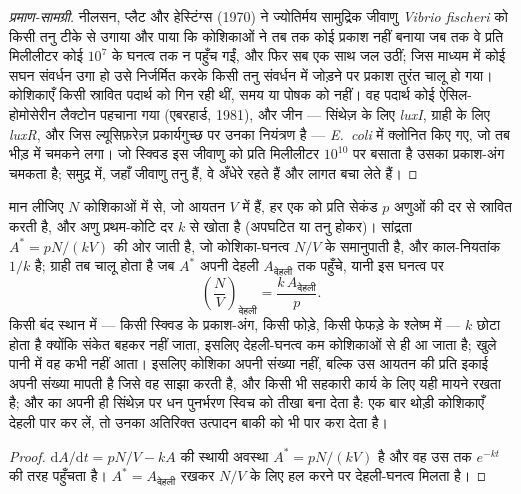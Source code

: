 \begin{proof}[प्रमाण-सामग्री]
नीलसन, प्लैट और हेस्टिंग्स (1970) ने ज्योतिर्मय सामुद्रिक जीवाणु
\emph{Vibrio fischeri} को किसी तनु टीके से उगाया और पाया कि कोशिकाओं ने
तब तक कोई प्रकाश नहीं बनाया जब तक वे प्रति मिलीलीटर कोई $10^{7}$ के
घनत्व तक न पहुँच गईं, और फिर सब एक साथ जल उठीं; जिस माध्यम में कोई सघन
संवर्धन उगा हो उसे निर्जर्मित करके किसी तनु संवर्धन में जोड़ने पर
प्रकाश तुरंत चालू हो गया। कोशिकाएँ किसी स्रावित पदार्थ को गिन रही
थीं, समय या पोषक को नहीं। वह पदार्थ कोई ऐसिल-होमोसेरीन लैक्टोन पहचाना
गया (एबरहार्ड, 1981), और जीन --- सिंथेज़ के लिए \emph{luxI},
ग्राही के लिए \emph{luxR}, और जिस ल्यूसिफ़रेज़ प्रकार्यगुच्छ पर उनका
नियंत्रण है --- \emph{E.~coli} में क्लोनित किए गए, जो तब भीड़ में चमकने
लगा। जो स्क्विड इस जीवाणु को प्रति मिलीलीटर $10^{10}$ पर बसाता है उसका
प्रकाश-अंग चमकता है; समुद्र में, जहाँ जीवाणु तनु हैं, वे अँधेरे रहते
हैं और लागत बचा लेते हैं।
\end{proof}

\begin{proposition}[घनत्व की एक देहली]\label{prop:b3:bacteriology:threshold}
मान लीजिए $N$ कोशिकाओं में से, जो आयतन $V$ में हैं, हर एक  को प्रति
सेकंड $p$ अणुओं की दर से स्रावित करती है, और अणु प्रथम-कोटि दर
$k$ से खोता है (अपघटित या तनु होकर)। सांद्रता
$A^{*} = pN/(kV)$ की ओर जाती है, जो कोशिका-घनत्व $N/V$ के समानुपाती है,
और काल-नियतांक $1/k$ है; ग्राही तब चालू होता है जब $A^{*}$ अपनी देहली
$A_{\text{देहली}}$ तक पहुँचे, यानी इस घनत्व पर
\[
\left(\frac{N}{V}\right)_{\text{देहली}} = \frac{k\,A_{\text{देहली}}}{p}.
\]
किसी बंद स्थान में --- किसी स्क्विड के प्रकाश-अंग, किसी फोड़े, किसी
फेफड़े के श्लेष्म में --- $k$ छोटा होता है क्योंकि संकेत बहकर नहीं जाता,
इसलिए देहली-घनत्व कम कोशिकाओं से ही आ जाता है; खुले पानी में वह कभी
नहीं आता। इसलिए कोशिका अपनी संख्या नहीं, बल्कि उस आयतन की प्रति इकाई
अपनी संख्या मापती है जिसे वह साझा करती है, और किसी भी सहकारी कार्य के
लिए यही मायने रखता है; और  का अपनी ही सिंथेज़ पर धन पुनर्भरण
स्विच को तीखा बना देता है: एक बार थोड़ी कोशिकाएँ देहली पार कर लें, तो
उनका अतिरिक्त उत्पादन बाकी को भी पार करा देता है।
\end{proposition}
\begin{proof}
$\mathrm{d}A/\mathrm{d}t = pN/V - kA$ की स्थायी अवस्था $A^{*} =
pN/(kV)$ है और वह उस तक $e^{-kt}$ की तरह पहुँचता है। $A^{*} = A_{\text{देहली}}$
रखकर $N/V$ के लिए हल करने पर देहली-घनत्व मिलता है।
\end{proof}


